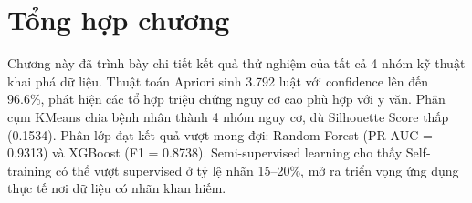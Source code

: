 \section{Tổng hợp chương}

Chương này đã trình bày chi tiết kết quả thử nghiệm của tất cả 4 nhóm kỹ thuật khai phá dữ liệu. Thuật toán Apriori sinh 3.792 luật với confidence lên đến 96.6\%, phát hiện các tổ hợp triệu chứng nguy cơ cao phù hợp với y văn. Phân cụm KMeans chia bệnh nhân thành 4 nhóm nguy cơ, dù Silhouette Score thấp (0.1534). Phân lớp đạt kết quả vượt mong đợi: Random Forest (PR-AUC = 0.9313) và XGBoost (F1 = 0.8738). Semi-supervised learning cho thấy Self-training có thể vượt supervised ở tỷ lệ nhãn 15--20\%, mở ra triển vọng ứng dụng thực tế nơi dữ liệu có nhãn khan hiếm.
